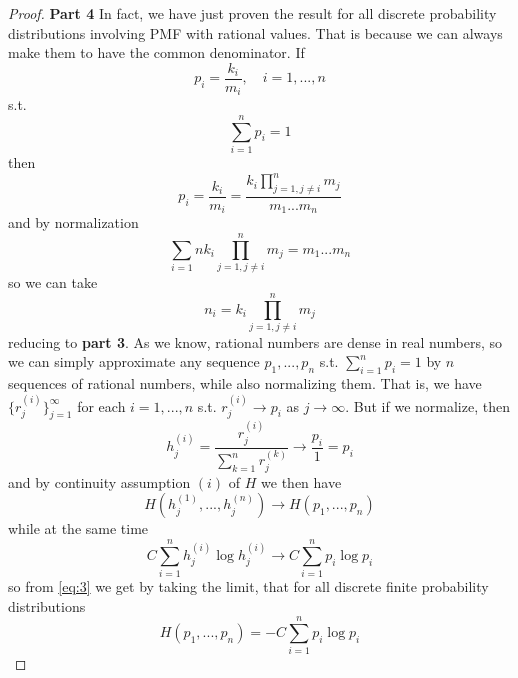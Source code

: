 \documentclass[12pt]{article}
\begin{document}
\begin{proof}
\noindent \textbf{Part 4} In fact, we have just proven the result for all discrete probability distributions involving PMF with rational values. That is because we can always make them to have the common denominator. If 
\begin{equation}
    p_i = \frac{k_i}{m_i}, \quad i = 1, ..., n
\end{equation}
s.t. 
\begin{equation}
    \sum_{i=1}^{n}{p_i} = 1 
\end{equation}
then 
\begin{equation}
    p_i = \frac{k_i}{m_i} = \frac{k_i \prod_{j=1, j \neq i}^{n}{m_j}}{m_1 ... m_n}
\end{equation}
and by normalization 
\begin{equation}
    \sum_{i=1}{n}{k_i \prod_{j=1, j \neq i}^{n}{m_j}} = m_1 ...  m_n 
\end{equation}
so we can take 
\begin{equation}
    n_i = k_i \prod_{j=1, j \neq i}^{n}{m_j}
\end{equation}
reducing to \textbf{part 3}. As we know, rational numbers are dense in real numbers, so we can simply approximate any sequence $p_1, ..., p_n$ s.t. $\sum_{i=1}^{n}{p_i} = 1$ by $n$ sequences of rational numbers, while also normalizing them. That is, we have $\{r_j^{(i)}\}_{j=1}^{\infty}$ for each $i = 1,..., n$ s.t. $r_j^{(i)} \to p_i$ as $j \to \infty$. But if we normalize, then 
\begin{equation}
    h_{j}^{(i)} = \frac{r_j^{(i)}}{\sum_{k=1}^{n}{r_j^{(k)}}} \to \frac{p_i}{1} = p_i 
\end{equation}
and by continuity assumption $(i)$ of $H$ we then have 
\begin{equation}
    H(h_{j}^{(1)}, ..., h_{j}^{(n)}) \to H(p_1, ..., p_n)
\end{equation}
while at the same time 
\begin{equation}
    C\sum_{i=1}^{n}{h_j^{(i)} \log h_j^{(i)}} \to C \sum_{i=1}^{n}{p_i \log p_i}
\end{equation}
so from \eqref{eq:3} we get by taking the limit, that for all discrete finite probability distributions 
\begin{equation}
    H(p_1, ..., p_n) = -C\sum_{i=1}^{n}{p_i \log p_i}
\end{equation}

\end{proof}
\end{document}
